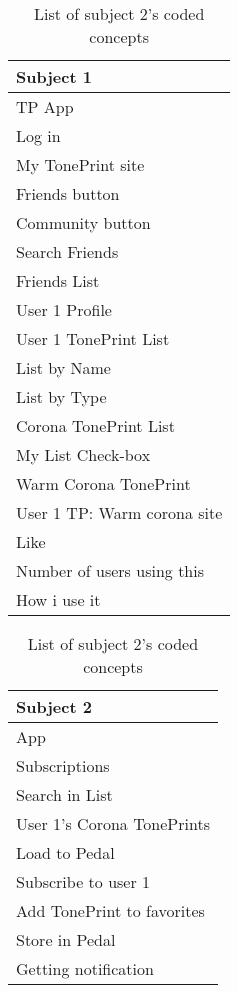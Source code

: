 \begin{table}[H]
\begin{minipage}[b]{0.5\linewidth}\centering

    \begin{tabular}{|l|}
    \hline
    Subject 1 \\ \hline
    TP App  \\
    Log in  \\
    My TonePrint site  \\
    Friends button  \\
    Community button  \\
    Search Friends  \\
    Friends List  \\
    User 1 Profile  \\
    User 1 TonePrint List  \\
    List by Name  \\
    List by Type  \\
    Corona TonePrint List  \\
    My List Check-box  \\
    Warm Corona TonePrint  \\
    User 1 TP: Warm corona site  \\
    Like  \\
    Number of users using this  \\
    How i use it  \\ \hline
    \end{tabular}
    \caption{List of subject 1's coded concepts}
    \label{tab:Subject1Coded}
    
	\begin{tabular}{|l|}
    \hline
    Subject 2 \\ \hline
    App \\
    Subscriptions  \\
    Search in List  \\
    User 1's Corona TonePrints  \\
    Load to Pedal  \\
    Subscribe to user 1  \\
    Add TonePrint to favorites  \\
    Store in Pedal  \\
    Getting notification  \\ \hline
    \end{tabular}
	\caption{List of subject 2's coded concepts}
    \label{tab:Subject2Coded}    
    

\end{minipage}
\end{table}
